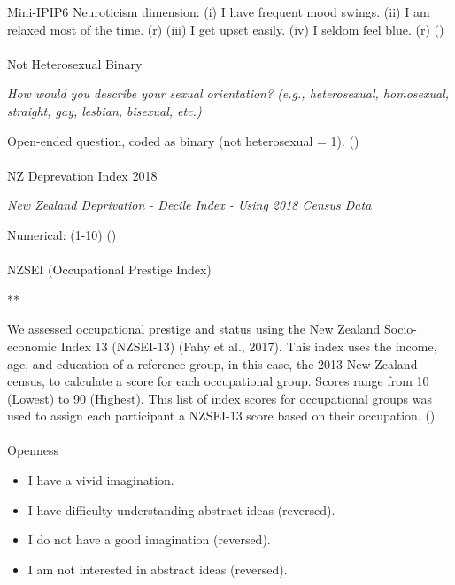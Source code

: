 \documentclass[
  single column]{article}
\makeatletter
\let\oldparagraph\paragraph
\renewcommand{\paragraph}{
    \@ifstar
      \xxxParagraphStar
      \xxxParagraphNoStar
  }
\newcommand{\xxxParagraphStar}[1]{\oldparagraph*{#1}\mbox{}}
\newcommand{\xxxParagraphNoStar}[1]{\oldparagraph{#1}\mbox{}}
\providecommand{\tightlist}{%
  \setlength{\itemsep}{0pt}\setlength{\parskip}{0pt}}\usepackage{longtable,booktabs,array}
\makeatother
\begin{document}
Mini-IPIP6 Neuroticism dimension: (i) I have frequent mood swings. (ii)
I am relaxed most of the time. (r) (iii) I get upset easily. (iv) I
seldom feel blue. (r) ()

\paragraph{Not Heterosexual Binary}\label{not-heterosexual-binary}

\emph{How would you describe your sexual orientation? (e.g.,
heterosexual, homosexual, straight, gay, lesbian, bisexual, etc.)}

Open-ended question, coded as binary (not heterosexual = 1).
()

\paragraph{NZ Deprevation Index 2018}\label{nz-deprevation-index-2018}

\emph{New Zealand Deprivation - Decile Index - Using 2018 Census Data}

Numerical: (1-10) ()

\paragraph{NZSEI (Occupational Prestige
Index)}\label{nzsei-occupational-prestige-index}

**

We assessed occupational prestige and status using the New Zealand
Socio-economic Index 13 (NZSEI-13) (Fahy et al., 2017). This index uses
the income, age, and education of a reference group, in this case, the
2013 New Zealand census, to calculate a score for each occupational
group. Scores range from 10 (Lowest) to 90 (Highest). This list of index
scores for occupational groups was used to assign each participant a
NZSEI-13 score based on their occupation. ()

\paragraph{Openness}\label{openness}

\begin{itemize}
\tightlist
\item
  I have a vivid imagination.
\item
  I have difficulty understanding abstract ideas (reversed).
\item
  I do not have a good imagination (reversed).
\item
  I am not interested in abstract ideas (reversed).
\end{itemize}
\end{document}
